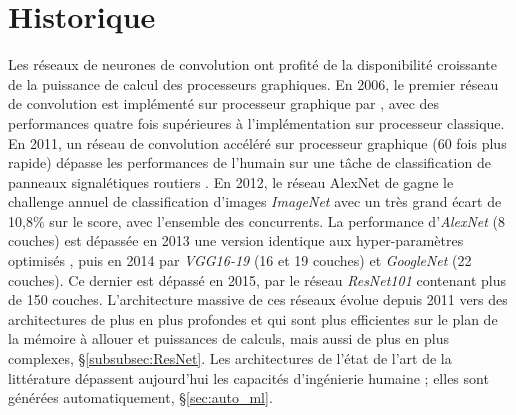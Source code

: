 \section{Historique}
Les réseaux de neurones de convolution ont profité de la disponibilité croissante de la puissance de calcul des processeurs graphiques.
En 2006, le premier réseau de convolution est implémenté sur processeur graphique par \citeauthor{chellapilla_high_2006} \cite{chellapilla_high_2006}, avec des performances quatre fois supérieures à l'implémentation sur processeur classique.
En 2011, un réseau de convolution accéléré sur processeur graphique (60 fois plus rapide) dépasse les performances de l'humain sur une tâche de classification de panneaux signalétiques routiers \cite{ciresan_flexible_2011}.
En 2012, le réseau AlexNet de \citeauthor{krizhevsky_imagenet_2012} \cite{krizhevsky_imagenet_2012} gagne le challenge annuel de classification d'images \textit{ImageNet} \cite{deng_imagenet_2009} avec un très grand écart de 10,8\% sur le score, avec l'ensemble des concurrents.
La performance d'\textit{AlexNet} (8 couches) est dépassée en 2013 une version identique aux hyper-paramètres optimisés \cite{zeiler_visualizing_2013}, puis en 2014 par \textit{VGG16-19} (16 et 19 couches) \cite{simonyan_very_2014}  et \textit{GoogleNet} (22 couches).
Ce dernier est dépassé en 2015, par le réseau \textit{ResNet101} \cite{he_deep_2015} contenant plus de 150 couches.
L'architecture massive de ces réseaux évolue depuis 2011 vers des architectures de plus en plus profondes \cite{he_deep_2015} et qui sont plus efficientes sur le plan de la mémoire à allouer et puissances de calculs, mais aussi de plus en plus complexes, §\ref{subsubsec:ResNet}.
Les architectures de l'état de l'art de la littérature dépassent aujourd'hui les capacités d'ingénierie humaine ; elles sont générées automatiquement, §\ref{sec:auto_ml}.

